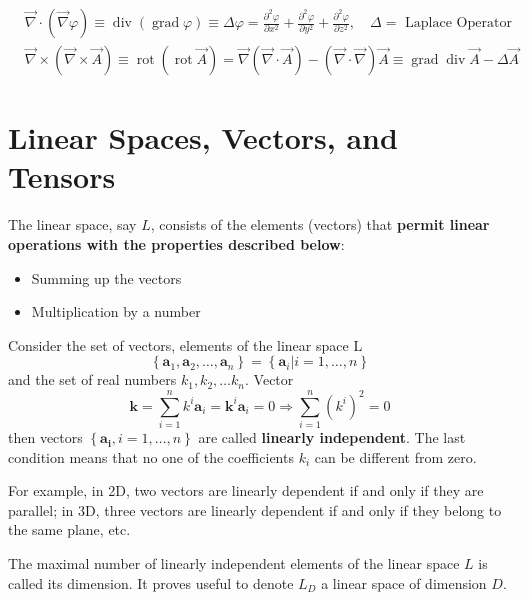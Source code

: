 \begin{equation}
\begin{aligned}
&\vec{\nabla} \cdot(\vec{\nabla} \varphi) \equiv \operatorname{div}(\operatorname{grad} \varphi) \equiv \Delta \varphi=\frac{\partial^{2} \varphi}{\partial x^{2}}+\frac{\partial^{2} \varphi}{\partial y^{2}}+\frac{\partial^{2} \varphi}{\partial z^{2}}, \quad \Delta=\text { Laplace Operator }\\
&\vec{\nabla} \times(\vec{\nabla} \times \vec{A}) \equiv \operatorname{rot}(\operatorname{rot} \vec{A})=\vec{\nabla}(\vec{\nabla} \cdot \vec{A})-(\vec{\nabla} \cdot \vec{\nabla}) \vec{A} \equiv \operatorname{grad} \operatorname{div} \vec{A}-\Delta \vec{A}
\end{aligned}
\end{equation}

\section{Linear Spaces, Vectors, and Tensors}
The linear space, say $L$, consists of the elements (vectors) that \textbf{permit linear operations with the properties described below}:
\begin{itemize}
    \item Summing up the vectors
    \item Multiplication by a number
\end{itemize}
\begin{qt}
    Consider the set of vectors, elements of the linear space L
    $$
\left\{\mathbf{a}_{1}, \mathbf{a}_{2}, \ldots, \mathbf{a}_{n}\right\}=\left\{\mathbf{a}_{i} | i=1, \ldots, n\right\}
$$
and the set of real numbers $k_{1}, k_{2}, \ldots k_{n} .$ Vector
$$
\mathbf{k}=\sum_{i=1}^{n} k^{i} \mathbf{a}_{i}=\mathbf{k}^{i} \mathbf{a}_{i}=0\Longrightarrow \sum_{i=1}^{n}\left(k^{i}\right)^{2}=0
$$
then vectors $\left\{\mathbf{a}_{\mathbf{i}}, i=1, \ldots, n\right\}$ are called \textbf{linearly independent}. The last condition means that no one of the coefficients $k_{i}$ can be different from zero.
\end{qt}
For example, in 2D, two vectors are linearly dependent if and only if they are parallel; in 3D, three vectors are linearly dependent if and only if they belong to the same plane, etc.
\begin{defi}
        The maximal number of linearly independent elements of the linear space $L$ is called its dimension. It proves useful to denote $L_{D}$ a linear space of dimension $D .$
\end{defi}
